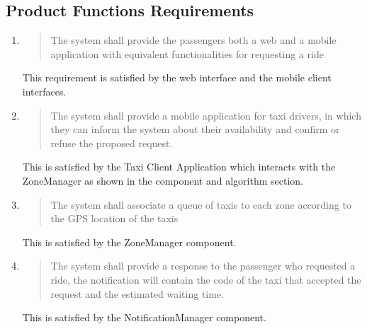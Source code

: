 \documentclass[11pt, a4paper,titlepage]{article}
\begin{document}
	\subsection{Product Functions Requirements}
		\begin{enumerate}
			\item
			\begin{quotation}
				The system shall provide the passengers both a web and a mobile application with equivalent functionalities for requesting a ride
			\end{quotation}
			This requirement is satisfied by the web interface and the mobile client interfaces.
			\item
			\begin{quotation}
				The system shall provide a mobile application for taxi drivers, in which they can inform the system about their availability and confirm or refuse the proposed request.
			\end{quotation}
			This is satisfied by the Taxi Client Application which interacts with the ZoneManager as shown in the component and algorithm section.
			\item
			\begin{quotation}
				The system shall associate a queue of taxis to each zone according to the GPS location of the taxis
			\end{quotation}
			This is satisfied by the ZoneManager component.
			\item
			\begin{quotation}
			 	 The system shall provide a response to the passenger who requested a ride, the notification will contain the code of the taxi that accepted the request and the estimated waiting time.
			\end{quotation}
			This is satisfied by the NotificationManager component.
			

\end{enumerate}
\end{document}
